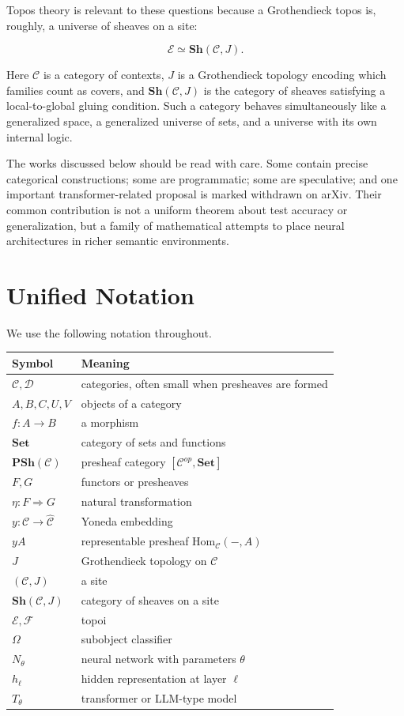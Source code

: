 \documentclass[11pt]{article}
\begin{document}
Topos theory is relevant to these questions because a Grothendieck topos is, roughly, a universe of sheaves on a site:


\[
\mathcal{E}\simeq \mathbf{Sh}(\mathcal{C},J).
\]

Here \(\mathcal{C}\) is a category of contexts, \(J\) is a Grothendieck topology encoding which families count as covers, and \(\mathbf{Sh}(\mathcal{C},J)\) is the category of sheaves satisfying a local-to-global gluing condition. Such a category behaves simultaneously like a generalized space, a generalized universe of sets, and a universe with its own internal logic.


The works discussed below should be read with care. Some contain precise categorical constructions; some are programmatic; some are speculative; and one important transformer-related proposal is marked withdrawn on arXiv. Their common contribution is not a uniform theorem about test accuracy or generalization, but a family of mathematical attempts to place neural architectures in richer semantic environments.


\section{Unified Notation}

We use the following notation throughout.


\begin{longtable}{>{\raggedright\arraybackslash}p{}>{\raggedright\arraybackslash}p{}}
\toprule
Symbol & Meaning \\
\midrule
\endhead
\(\mathcal{C},\mathcal{D}\) & categories, often small when presheaves are formed \\
\(A,B,C,U,V\) & objects of a category \\
\(f:A\to B\) & a morphism \\
\(\mathbf{Set}\) & category of sets and functions \\
\(\mathbf{PSh}(\mathcal{C})\) & presheaf category \([\mathcal{C}^{op},\mathbf{Set}]\) \\
\(F,G\) & functors or presheaves \\
\(\eta:F\Rightarrow G\) & natural transformation \\
\(y:\mathcal{C}\to \widehat{\mathcal{C}}\) & Yoneda embedding \\
\(yA\) & representable presheaf \(\mathrm{Hom}_{\mathcal{C}}(-,A)\) \\
\(J\) & Grothendieck topology on \(\mathcal{C}\) \\
\((\mathcal{C},J)\) & a site \\
\(\mathbf{Sh}(\mathcal{C},J)\) & category of sheaves on a site \\
\(\mathcal{E},\mathcal{F}\) & topoi \\
\(\Omega\) & subobject classifier \\
\(N_\theta\) & neural network with parameters \(\theta\) \\
\(h_\ell\) & hidden representation at layer \(\ell\) \\
\(T_\theta\) & transformer or LLM-type model \\
\bottomrule
\end{longtable}
\end{document}
